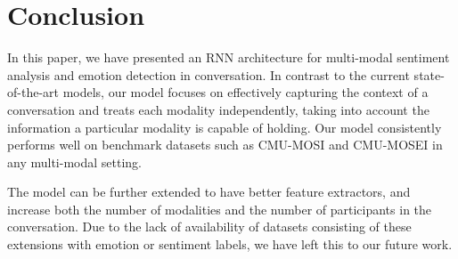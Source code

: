 \documentclass[11pt,a4paper]{article}
\begin{document}
\section{Conclusion}
In this paper, we have presented an RNN architecture for multi-modal sentiment analysis and emotion detection in conversation. In contrast to the current state-of-the-art models, our model focuses on effectively capturing the context of a conversation and treats each modality independently, taking into account the information a particular modality is capable of holding. Our model consistently performs well on benchmark datasets such as CMU-MOSI and CMU-MOSEI in any multi-modal setting. 


The model can be further extended to have better feature extractors, and increase both the number of modalities and the number of participants in the conversation. Due to the lack of availability of datasets consisting of these extensions with emotion or sentiment labels, we have left this to our future work.



\end{document}
